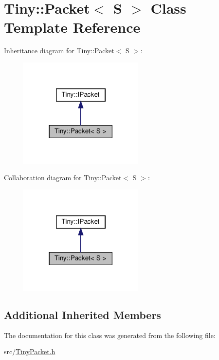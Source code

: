 \hypertarget{classTiny_1_1Packet}{}\section{Tiny\+:\+:Packet$<$ S $>$ Class Template Reference}
\label{classTiny_1_1Packet}


Inheritance diagram for Tiny\+:\+:Packet$<$ S $>$\+:
\nopagebreak
\begin{figure}[H]
\begin{center}
\leavevmode
\includegraphics[width=177pt]{classTiny_1_1Packet__inherit__graph}
\end{center}
\end{figure}


Collaboration diagram for Tiny\+:\+:Packet$<$ S $>$\+:
\nopagebreak
\begin{figure}[H]
\begin{center}
\leavevmode
\includegraphics[width=177pt]{classTiny_1_1Packet__coll__graph}
\end{center}
\end{figure}
\subsection*{Additional Inherited Members}


The documentation for this class was generated from the following file\+:\begin{DoxyCompactItemize}
\item 
src/\hyperlink{TinyPacket_8h}{Tiny\+Packet.\+h}\end{DoxyCompactItemize}
